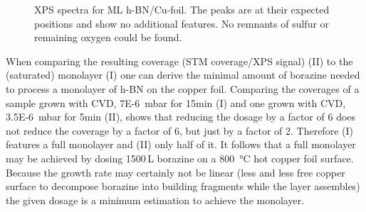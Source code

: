 \begin{figure}[ht]
\centering
{}
\caption{XPS spectra for ML h-BN/Cu-foil. The peaks are at their expected positions\cite{kidambi_situ_2014} and show no additional features. No remnants of sulfur or remaining oxygen could be found.}
\label{fig:xps-self-grown}
\end{figure}

When comparing the resulting coverage (STM coverage/XPS signal) (II) to the (saturated) monolayer (I) one can derive the minimal amount of borazine needed to process a monolayer of h-BN on the copper foil. Comparing the coverages of a sample grown with CVD, \SI{7E-6}{\milli \bar} for 15min (I) and one grown with CVD, \SI{3.5E-6}{\milli \bar} for 5min (II), shows that reducing the dosage by a factor of 6 does not reduce the coverage by a factor of 6, but just by a factor of 2. Therefore (I) features a full monolayer and (II) only half of it. It follows that a full monolayer may be achieved by dosing 1500\,L borazine on a \SI{800}{\degreeCelsius} hot copper foil surface. 
Because the growth rate may certainly not be linear (less and less free copper surface to decompose borazine into building fragments while the layer assembles) the given dosage is a minimum estimation to achieve the monolayer.

